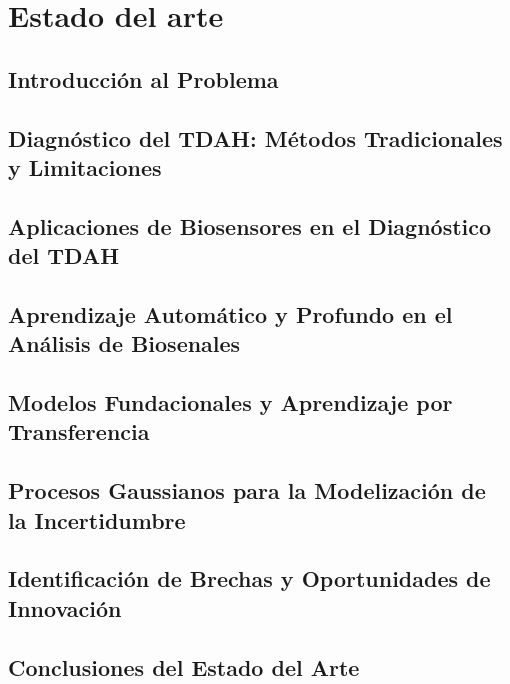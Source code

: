 \section{Estado del arte}

\subsection{Introducción al Problema}

\subsection{Diagnóstico del TDAH: Métodos Tradicionales y Limitaciones}

\subsection{Aplicaciones de Biosensores en el Diagnóstico del TDAH}

\subsection{Aprendizaje Automático y Profundo en el Análisis de Biosenales}

\subsection{Modelos Fundacionales y Aprendizaje por Transferencia}

\subsection{Procesos Gaussianos para la Modelización de la Incertidumbre}

\subsection{Identificación de Brechas y Oportunidades de Innovación}

\subsection{Conclusiones del Estado del Arte}
